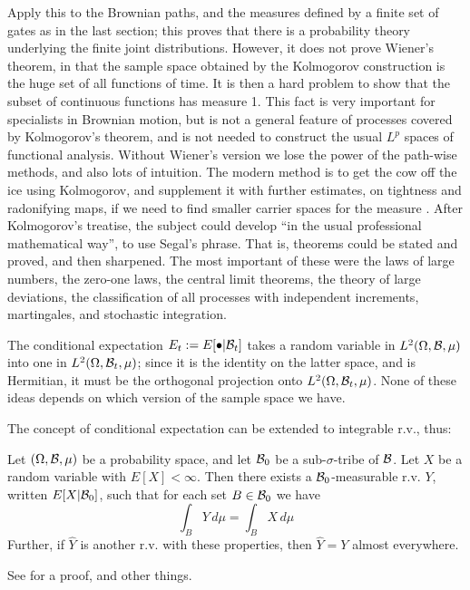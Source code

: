 Apply this to the Brownian paths, and the
measures defined by a finite set of gates as in the last section;
this proves
that there is a probability theory underlying the finite joint
distributions. However, it does not prove Wiener's theorem, in that the
sample space obtained by the Kolmogorov construction is the huge set of all
functions of time. It is then a hard problem to show that the subset
of continuous functions has measure 1. This fact is very important
for specialists in Brownian motion, but is not a general feature of
processes covered by Kolmogorov's theorem, and is not needed to construct
the usual $L^p$ spaces of functional analysis.
Without Wiener's version
we lose the power of the path-wise methods, and also lots of intuition.
The modern method is to get the cow off the ice using Kolmogorov, and
supplement it with further estimates, on tightness and radonifying maps,
if we need to find smaller carrier spaces for the measure
\cite{Gross,Schwartz}.
After Kolmogorov's treatise, the subject could develop ``in the usual
professional mathematical way'', to use Segal's phrase. That is, theorems
could be stated and proved, and then sharpened. The most important of these
were the laws of large numbers, the zero-one laws, the central limit
theorems,
the theory of large deviations, the classification of all processes with
independent increments, martingales, and stochastic integration.


The conditional
expectation $E_t:=E[\bullet|{\cal B}_t]$ takes a random variable in
$L^2(\Omega,{\cal B},\mu)$ into one in $L^2(\Omega,{\cal B}_t,\mu)$;
since it is the identity on the latter space, and is Hermitian,
it must be the orthogonal projection onto $L^2(\Omega,{\cal B}_t,\mu)$.
None of these ideas depends on which version of the sample space we have.


The concept of conditional expectation can be extended to integrable
r.v., thus:
\begin{definition}
Let $(\Omega,{\cal B},\mu)$ be a probability space, and let ${\cal B}_0$ be
a sub-$\sigma$-tribe of ${\cal B}$. Let $X$ be a random variable with
$E[X]<\infty$. Then there exists a ${\cal B}_0$-measurable r.v. $Y$,
written $E[X|{\cal B}_0]$, such that for each set $B\in{\cal B}_0$ we have
\begin{equation}
\int_BY\,d\mu=\int_BX\,d\mu
\end{equation}
Further, if $\hat{Y}$ is another r.v. with these properties, then
$\hat{Y}=Y$ almost everywhere.
\end{definition}
See \cite{Williams} for a proof, and other things.

